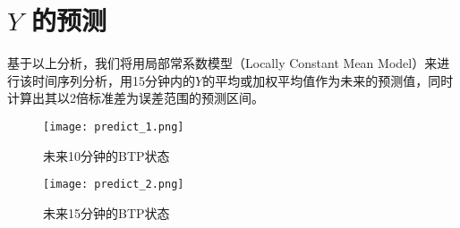 \documentclass[12pt,a4paper]{article}
\begin{document}
\section{$ Y $ 的预测}


基于以上分析，我们将用局部常系数模型（Locally Constant Mean Model）来进行该时间序列分析，用15分钟内的$ Y $的平均或加权平均值作为未来的预测值，同时计算出其以2倍标准差为误差范围的预测区间。
\begin{figure}[H]
 \centering
 \texttt{[image: predict\_1.png]}\\
 \caption{未来10分钟的BTP状态\quad}
\end{figure}

\begin{figure}[H]
 \centering
 \texttt{[image: predict\_2.png]}\\
 \caption{未来15分钟的BTP状态\quad}
\end{figure}
\end{document}
